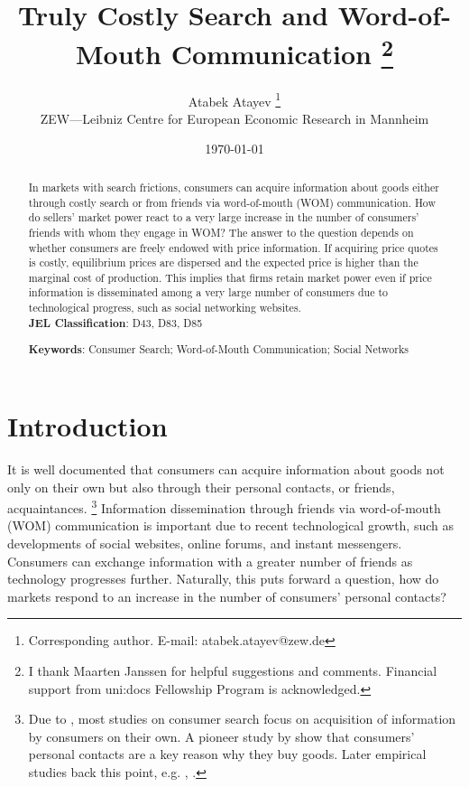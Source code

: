 \documentclass[12pt]{article}
\begin{document}
	\title{Truly Costly Search and Word-of-Mouth Communication%
		\thanks{
			I thank Maarten Janssen for helpful suggestions and 
			comments.  Financial support from uni:docs 
			Fellowship Program is acknowledged.
		}
}
	\author{Atabek Atayev
		\thanks{%
			Corresponding author. E-mail: atabek.atayev@zew.de}
			\\
			\small{ZEW---Leibniz Centre for European 
				Economic Research in Mannheim}	
}
		\date{\today}
		
		\maketitle

\begin{abstract}
	\noindent In markets with search frictions, consumers can 
	acquire information about goods either through costly search 
	or from friends via word-of-mouth (WOM) communication.  How 
	do sellers' market power react to a very large increase 
	in the number of consumers' friends with whom they engage in 
	WOM? The answer to the question depends on 	whether 
	consumers are freely endowed with price information.  If 	
	acquiring price quotes is costly, equilibrium prices are 
	dispersed and the expected price is higher than the marginal 
	cost of production.  This implies that firms retain market 
	power even if price information is disseminated among a very 
	large number of consumers due to technological 
	progress, such as social networking websites.
	\\
	
	\noindent \textbf{JEL Classification}: D43, D83, D85
	
	\noindent \textbf{Keywords}: Consumer Search; Word-of-Mouth Communication; 
	Social Networks
\end{abstract}
\newpage

	\sloppy
\section{Introduction}


It is well documented that consumers can acquire information 
about goods not only on their own but also through their 
personal contacts, or friends, acquaintances.%
\footnote{Due to \cite{stigler1961}, most studies on consumer
	search focus on acquisition of information by consumers on 
	their own.  A pioneer study by \cite{katzlazarsfeld1955} 
	show that consumers' personal contacts are a key reason why 
	they buy goods. Later empirical studies back this point, 
	e.g. \cite{godesmayzlin2004}, \cite{chenetal2011}.}
Information dissemination through friends via word-of-mouth 
(WOM) communication is important due to recent technological 
growth, such as developments of social websites, online 
forums, and instant messengers.  Consumers can exchange 
information with a greater number of friends as technology 
progresses further.  Naturally, this puts forward a question, 
how do markets respond to an increase in the number of 
consumers' personal contacts?  
\end{document}
